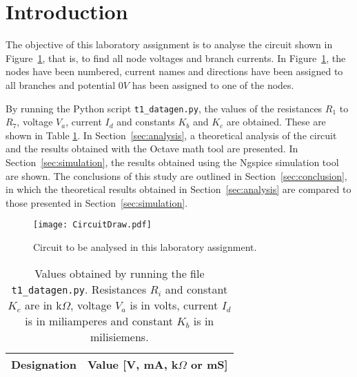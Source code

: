 \section{Introduction}
\label{sec:introduction}

The objective of this laboratory assignment is to analyse the circuit shown in Figure~\ref{fig:CircuitDraw}, that is, to find all node voltages and branch currents. In Figure~\ref{fig:CircuitDraw}, the nodes have been numbered, current names and directions have been assigned to all branches and potential $0V$ has been assigned to one of the nodes.
\par
By running the Python script \texttt{t1\_datagen.py}, the values of the resistances $R_1$ to $R_7$, voltage $V_a$, current $I_d$ and constants $K_b$ and $K_c$ are obtained. These are shown in Table \ref{tab:GivenValues}. In Section~\ref{sec:analysis}, a theoretical analysis of the circuit and the results obtained with the Octave math tool are presented. In Section~\ref{sec:simulation}, the results obtained using the Ngspice simulation tool are shown. The conclusions of this study are outlined in Section~\ref{sec:conclusion}, in which the theoretical results obtained in Section~\ref{sec:analysis} are compared to those presented in Section~\ref{sec:simulation}.

\begin{figure}[H] \centering
  \texttt{[image: CircuitDraw.pdf]}
  \caption{Circuit to be analysed in this laboratory assignment.}
  \label{fig:CircuitDraw}
\end{figure}


\begin{table}[H]
  \centering
  \begin{tabular}{|c|c|}
    \hline    
    {\bf Designation} & {\bf Value [V, mA, k$\Omega$ or mS]} \\ \hline
    
  \end{tabular}
  \caption{Values obtained by running the file \texttt{t1\_datagen.py}. Resistances $R_i$ and constant $K_c$ are in k$\Omega$, voltage $V_a$ is in volts, current $I_d$ is in miliamperes and constant $K_b$ is in milisiemens.}
  \label{tab:GivenValues}
\end{table}

